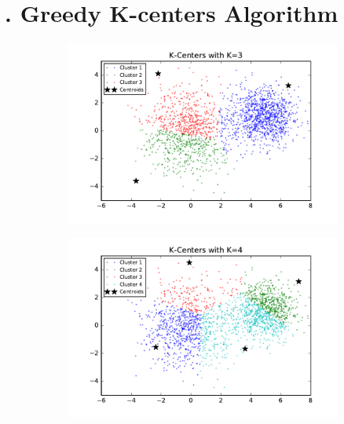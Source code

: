 \section*{\Large {}. Greedy K-centers Algorithm}

\begin{figure}[htb]
        \centering
        \begin{subfigure}[b]{0.475\textwidth}
            \centering
            \includegraphics[width=\textwidth]{./figures/clustering_kCenter_3.pdf}
        \end{subfigure}
        \hfill
        \begin{subfigure}[b]{0.475\textwidth}  
            \centering 
            \includegraphics[width=\textwidth]{./figures/clustering_kCenter_4.pdf}

\end{subfigure}
\end{figure}
